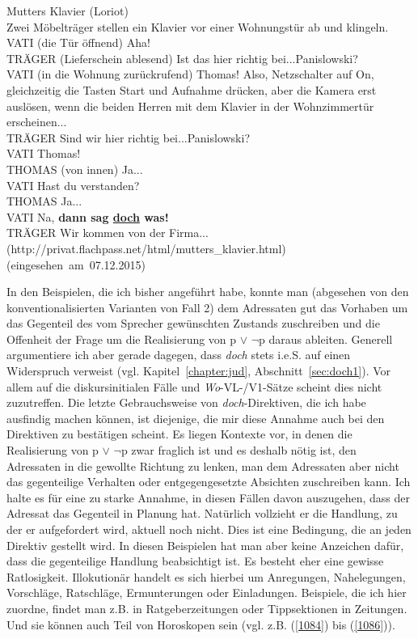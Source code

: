 {\begin{exe}
	\ex\label{1083} 
	\scriptsize
    Mutters Klavier (Loriot)\\
    Zwei Möbelträger stellen ein Klavier vor einer Wohnungstür ab und klingeln.\\
	VATI (die Tür öffnend) Aha!\\
	TRÄGER (Lieferschein ablesend) Ist das hier richtig bei...Panislowski?\\
	VATI (in die Wohnung zurückrufend) Thomas! Also, Netzschalter auf \glqq On\grqq{}, gleichzeitig die Tasten \glqq Start\grqq{} und \glqq Aufnahme\grqq{} 	drücken, aber die Kamera erst auslösen, wenn die beiden Herren mit dem Klavier in der Wohnzimmertür erscheinen...\\
	TRÄGER Sind wir hier richtig bei...Panislowski?\\
	VATI Thomas!\\
	THOMAS (von innen) Ja...\\
	VATI Hast du verstanden?\\
	THOMAS Ja...\\
	VATI Na, \textbf{dann sag \underline{doch} was!}\\
	TRÄGER Wir kommen von der Firma... 
    \hfill\hbox{(http://privat.flachpass.net/html/mutters\_klavier.html)}		
    \newline
    \hbox{}\hfill\hbox{(eingesehen am 07.12.2015)}			     
\end{exe}
In den Beispielen, die ich bisher angeführt habe, konnte man (abgesehen von den konventionalisierten Varianten von Fall 2) dem Adressaten gut das Vorhaben um das Gegenteil des vom Sprecher gewünschten Zustands zuschreiben und die Offenheit der Frage um die Rea\-lisierung von p $\vee$ $\neg$p daraus ableiten. Generell argumentiere ich aber gerade dagegen, dass \textit{doch} stets i.e.S. auf einen Widerspruch verweist (vgl. Kapitel~\ref{chapter:jud}, Abschnitt~\ref{sec:doch1}). Vor allem auf die diskursinitialen Fälle und \textit{Wo}-VL-/V1-Sätze scheint dies nicht zuzutreffen. Die letzte Gebrauchsweise von \textit{doch}-Direktiven, die ich habe ausfindig machen können, ist diejenige, die mir diese Annahme auch bei den Direktiven zu bestätigen scheint. Es liegen Kontexte vor, in denen die Realisierung von  p $\vee$ $\neg$p zwar fraglich ist und es deshalb nötig ist, den Adressaten in die gewollte Richtung zu lenken, man dem Adressaten aber nicht das gegenteilige Verhalten oder entgegengesetzte Absichten zuschreiben kann. Ich halte es für eine zu starke Annahme, in diesen Fällen davon auszugehen, dass der Adressat das Gegenteil in Planung hat. Natürlich vollzieht er die Handlung, zu der er aufgefordert wird, aktuell noch nicht. Dies ist eine Bedingung, die an jeden Direktiv gestellt wird. In diesen Beispielen hat man aber keine Anzeichen dafür, dass die gegenteilige Handlung beabsichtigt ist. Es besteht eher eine gewisse Ratlosigkeit. Illokutionär handelt es sich hierbei um Anregungen, Nahelegungen, Vorschläge, Ratschläge, Ermunterungen oder Einladungen. Beispiele, die ich hier zuordne, findet man z.B. in Ratgeberzeitungen oder Tippsektionen in Zeitungen. Und sie können auch Teil von Horoskopen sein (vgl. z.B. (\ref{1084}) bis (\ref{1086})).

}
